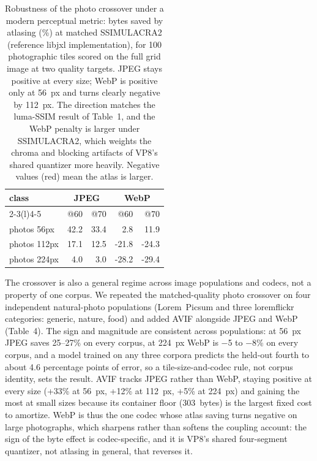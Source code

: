 \documentclass[3p,twocolumn]{elsarticle}
\newcommand{\nv}[1]{\textcolor{negred}{#1}}
\begin{document}
\begin{table}[t]
\centering
\small
\setlength{\tabcolsep}{4pt}
\begin{tabular}{@{}l rr rr@{}}
\toprule
class & \multicolumn{2}{c}{JPEG} & \multicolumn{2}{c}{WebP} \\ \cmidrule(l){2-3}\cmidrule(l){4-5}
& @60 & @70 & @60 & @70 \\
\midrule
photos 56px & 42.2 & 33.4 & 2.8 & 11.9 \\
photos 112px & 17.1 & 12.5 & \nv{-21.8} & \nv{-24.3} \\
photos 224px & 4.0 & 3.0 & \nv{-28.2} & \nv{-29.4} \\
\bottomrule
\end{tabular}
\caption{Robustness of the photo crossover under a modern
perceptual metric: bytes saved by atlasing (\%) at matched SSIMULACRA2
(reference libjxl implementation), for 100 photographic tiles scored on
the full grid image at two quality targets. JPEG stays positive at every
size; WebP is positive only at 56~px and turns clearly negative by
112~px. The direction matches the luma-SSIM result of Table~1, and the
WebP penalty is larger under SSIMULACRA2, which weights the chroma and
blocking artifacts of VP8's shared quantizer more
heavily. Negative values (red) mean the atlas is larger.}

\end{table}


The crossover is also a general regime across image populations and
codecs, not a property of one corpus. We repeated the matched-quality
photo crossover on four independent natural-photo populations
(Lorem~Picsum and three loremflickr categories: generic, nature, food)
and added AVIF alongside JPEG and WebP (Table~4). The sign and magnitude
are consistent across populations: at 56~px JPEG saves 25--27\% on every
corpus, at 224~px WebP is −5 to −8\% on every corpus, and a model
trained on any three corpora predicts the held-out fourth to about 4.6
percentage points of error, so a tile-size-and-codec rule, not corpus
identity, sets the result. AVIF tracks JPEG rather than WebP, staying
positive at every size (+33\% at 56~px, +12\% at 112~px, +5\% at 224~px)
and gaining the most at small sizes because its container floor
(303~bytes) is the largest fixed cost to amortize. WebP is thus the one
codec whose atlas saving turns negative on large photographs, which
sharpens rather than softens the coupling account: the sign of the byte
effect is codec-specific, and it is VP8's shared
four-segment quantizer, not atlasing in general, that reverses it.
\end{document}
